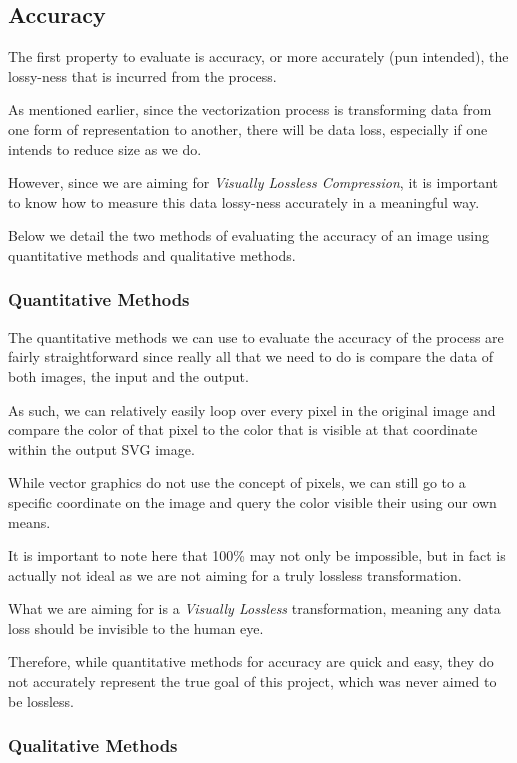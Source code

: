 \documentclass[12pt]{article}
\newcommand{\sentence}{} %
\newcommand{\italic}[1]{\textit{#1}}
\begin{document}
    \subsection{Accuracy}\label{subsec:accuracy}

    \tab
    The first property to evaluate is accuracy, or more accurately (pun intended), the lossy-ness that is incurred
    from the process.
    \sentence
    As mentioned earlier, since the vectorization process is transforming data from one form of representation to
    another, there will be data loss, especially if one intends to reduce size as we do.
    \sentence
    However, since we are aiming for \italic{Visually Lossless Compression}, it is important to know how to measure
    this data lossy-ness accurately in a meaningful way.
    \sentence
    Below we detail the two methods of evaluating the accuracy of an image using quantitative methods and qualitative
    methods.

    \subsubsection{Quantitative Methods}\label{subsubsec:quantitative-methods}

    \tab
    The quantitative methods we can use to evaluate the accuracy of the process are fairly straightforward since
    really all that we need to do is compare the data of both images, the input and the output.
    \sentence
    As such, we can relatively easily loop over every pixel in the original image and compare the color of that pixel
    to the color that is visible at that coordinate within the output SVG image.
    \sentence
    While vector graphics do not use the concept of pixels, we can still go to a specific coordinate on the image and
    query the color visible their using our own means.
    \sentence
    It is important to note here that 100\% may not only be impossible, but in fact is actually not ideal as we are
    not aiming for a truly lossless transformation.
    \sentence
    What we are aiming for is a \italic{Visually Lossless} transformation, meaning any data loss should be invisible
    to the human eye.
    \sentence
    Therefore, while quantitative methods for accuracy are quick and easy, they do not accurately represent the true
    goal of this project, which was never aimed to be lossless.

    \subsubsection{Qualitative Methods}\label{subsubsec:qualitative-methods}
\end{document}
